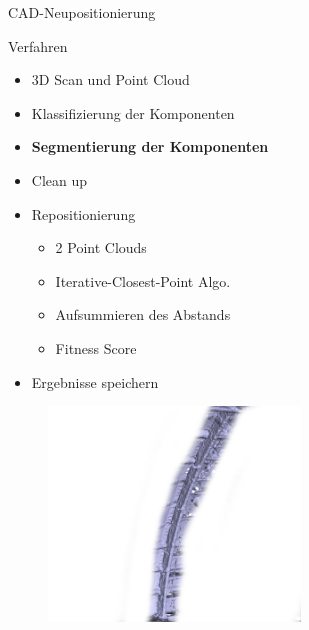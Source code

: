 \begin{frame}{CAD-Neupositionierung}
    \begin{minipage}[m]{0.49\textwidth}
    \begin{block}{Verfahren}
        \begin{itemize}
            \item 3D Scan und Point Cloud
            \item Klassifizierung der Komponenten
            \item \textbf{Segmentierung der Komponenten}
            \item Clean up
            \item Repositionierung
            \begin{itemize}
                \item 2 Point Clouds
                \item Iterative-Closest-Point Algo.
                \item Aufsummieren des Abstands
                \item Fitness Score
            \end{itemize}
            \item Ergebnisse speichern
        \end{itemize}
    \end{block}
    \end{minipage}
    \begin{minipage}[m]{0.49\textwidth}
      \begin{figure}
          \includegraphics[width=190pt]{img_niklas/aircraft_3dscan_segmented.PNG}
          \label{fig:my_label}
      \end{figure}
    \end{minipage}
\end{frame}

